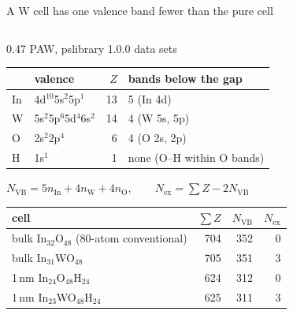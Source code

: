 \begin{frame}[t]{A W cell has one valence band fewer than the pure cell}
  \fivedense\fiveTop
  \begin{columns}[T,onlytextwidth]
    \begin{column}{0.47\textwidth}
      \begingroup\footnotesize PAW, pslibrary 1.0.0 data sets\par\endgroup
      \vspace{0.5mm}
      \begingroup\scriptsize
      \renewcommand{\arraystretch}{1.0}
      \begin{tabular}{@{}l l r l@{}}
        \toprule
        & valence & $Z$ & bands below the gap \\
        \midrule
        In & 4d$^{10}$5s$^2$5p$^1$ & 13 & 5 (In 4d) \\
        W  & 5s$^2$5p$^6$5d$^4$6s$^2$ & 14 & 4 (W 5s, 5p) \\
        O  & 2s$^2$2p$^4$ & 6 & 4 (O 2s, 2p) \\
        H  & 1s$^1$ & 1 & none (O--H within O bands) \\
        \bottomrule
      \end{tabular}\par\endgroup
      \vspace{1.1mm}
      \begingroup\footnotesize\centering
        $N_{\mathrm{VB}} = 5n_{\mathrm{In}} + 4n_{\mathrm{W}} + 4n_{\mathrm{O}}, \qquad
        N_{\mathrm{ex}} = \textstyle\sum Z - 2N_{\mathrm{VB}}$\par\endgroup
      \vspace{0.9mm}
      \begingroup\scriptsize
      \renewcommand{\arraystretch}{1.0}
      \begin{tabular}{@{}l r r r@{}}
        \toprule
        cell & $\sum Z$ & $N_{\mathrm{VB}}$ & $N_{\mathrm{ex}}$ \\
        \midrule
        bulk In$_{32}$O$_{48}$ (80-atom conventional) & 704 & 352 & 0 \\
        bulk In$_{31}$WO$_{48}$ & 705 & 351 & 3 \\
        1\,nm In$_{24}$O$_{48}$H$_{24}$ & 624 & 312 & 0 \\
        1\,nm In$_{23}$WO$_{48}$H$_{24}$ & 625 & 311 & 3 \\
        \bottomrule
      \end{tabular}\par\endgroup

\end{column}
\end{columns}
\end{frame}
